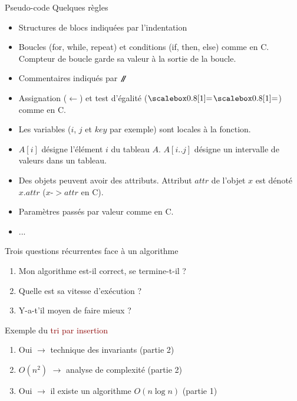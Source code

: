 \begin{frame}{Pseudo-code}
Quelques règles
\begin{itemize}
\item Structures de blocs indiquées par l'indentation
\item Boucles (for, while, repeat) et conditions (if, then, else) comme en C. Compteur de boucle garde sa valeur à la sortie de la boucle.
\item Commentaires indiqués par $\texttt{\textbf{/\hspace*{-0.3em}/}}\ $
\item Assignation ($\gets$) et test d'égalité ($\isequal$) comme en C.
\item Les variables ($i$, $j$ et $key$ par exemple) sont locales à la fonction.
\item $A[i]$ désigne l'élément $i$ du tableau $A$. $A[i..j]$ désigne un intervalle de valeurs dans un tableau.
\item Des objets peuvent avoir des attributs. Attribut $attr$ de l'objet $x$ est dénoté $x.attr$ ($x$-$>$$attr$ en C).
\item Paramètres passés par valeur comme en C.
\item ...
\end{itemize}

\end{frame}

\begin{frame}{Trois questions récurrentes face à un algorithme}

\begin{enumerate}
\item Mon algorithme est-il correct, se termine-t-il ? %

\bigskip

\item Quelle est sa vitesse d'exécution ? %

\bigskip

\item Y-a-t'il moyen de faire mieux ? %

\end{enumerate}

\bigskip

Exemple du \textcolor{darkred}{tri par insertion}
\begin{enumerate}
\item Oui $\rightarrow$ technique des invariants (partie 2)
\item $O(n^2)$ $\rightarrow$ analyse de complexité (partie 2)
\item Oui $\rightarrow$ il existe un algorithme $O(n\log n)$ (partie 1)
\end{enumerate}

\end{frame}

